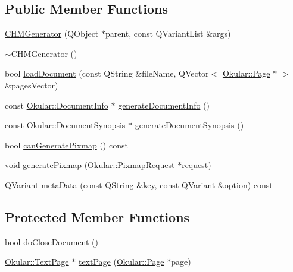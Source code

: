 \subsection*{Public Member Functions}
\begin{DoxyCompactItemize}
\item 
\hyperlink{classCHMGenerator_a62bbb2287ce107cb02af60fca55e2a66}{C\+H\+M\+Generator} (Q\+Object $\ast$parent, const Q\+Variant\+List \&args)
\item 
\hyperlink{classCHMGenerator_aa6b744aa2e72a05309f6790eb1056ec0}{$\sim$\+C\+H\+M\+Generator} ()
\item 
bool \hyperlink{classCHMGenerator_adabe55488d27e4fe901db82abab46ae1}{load\+Document} (const Q\+String \&file\+Name, Q\+Vector$<$ \hyperlink{classOkular_1_1Page}{Okular\+::\+Page} $\ast$ $>$ \&pages\+Vector)
\item 
const \hyperlink{classOkular_1_1DocumentInfo}{Okular\+::\+Document\+Info} $\ast$ \hyperlink{classCHMGenerator_a892ef3f3685cb701ed0c07681313dc8c}{generate\+Document\+Info} ()
\item 
const \hyperlink{classOkular_1_1DocumentSynopsis}{Okular\+::\+Document\+Synopsis} $\ast$ \hyperlink{classCHMGenerator_a6e844b636798a41d3e47f13f18477676}{generate\+Document\+Synopsis} ()
\item 
bool \hyperlink{classCHMGenerator_a4ef1e1dd09459db0669484ee746226ad}{can\+Generate\+Pixmap} () const 
\item 
void \hyperlink{classCHMGenerator_ad4d1606c48e0348950d9fc6ab92e34bc}{generate\+Pixmap} (\hyperlink{classOkular_1_1PixmapRequest}{Okular\+::\+Pixmap\+Request} $\ast$request)
\item 
Q\+Variant \hyperlink{classCHMGenerator_a00c6f5fd227de74f1f70a1538216b4b7}{meta\+Data} (const Q\+String \&key, const Q\+Variant \&option) const 
\end{DoxyCompactItemize}
\subsection*{Protected Member Functions}
\begin{DoxyCompactItemize}
\item 
bool \hyperlink{classCHMGenerator_a8675493780e9540540acb4ca2bdf13e1}{do\+Close\+Document} ()
\item 
\hyperlink{classOkular_1_1TextPage}{Okular\+::\+Text\+Page} $\ast$ \hyperlink{classCHMGenerator_a4573bf1fd7c852641fee327d5d13de48}{text\+Page} (\hyperlink{classOkular_1_1Page}{Okular\+::\+Page} $\ast$page)
\end{DoxyCompactItemize}
